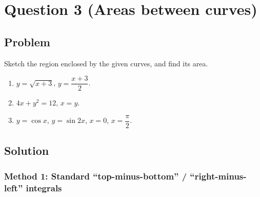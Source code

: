 \documentclass[12pt]{article}
\begin{document}
\newpage


\section*{Question 3 (Areas between curves)}

\subsection*{Problem}
Sketch the region enclosed by the given curves, and find its area.
\begin{enumerate}[label=(\alph*)]
\item \(y = \sqrt{x+3}\), \(y = \dfrac{x+3}{2}\).
\item \(4x + y^2 = 12\), \(x = y\).
\item \(y = \cos x\), \(y = \sin 2x\), \(x=0\), \(x=\dfrac{\pi}{2}\).
\end{enumerate}

\subsection*{Solution}

\subsubsection*{Method 1: Standard ``top-minus-bottom'' / ``right-minus-left'' integrals}
\end{document}
